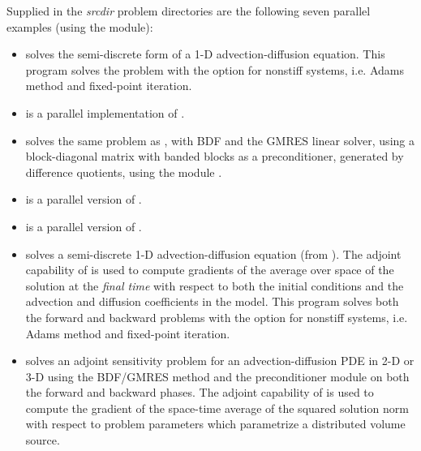 
\vspace{0.2in}\noindent 
Supplied in the {\em srcdir} problem directories are
the following seven parallel examples (using the {\nvecp} module):

\begin{itemize}


\item {}
  solves the semi-discrete form of a 1-D advection-diffusion equation.
  \newline
  This program solves the problem with the option for nonstiff systems,
  i.e. Adams method and fixed-point iteration.
\item {}
  is a parallel implementation of .
\item {}
  solves the same problem as , with BDF and the GMRES linear
  solver, using a block-diagonal matrix with banded blocks as a preconditioner, 
  generated by difference quotients, using the module {\cvbbdpre}.


\item {}
  is a parallel version of .
\item {}
  is a parallel version of .

\item {}
  solves a semi-discrete 1-D advection-diffusion equation (from ).
  \newline
  The adjoint capability of {\cvodes} is used to compute gradients
  of the average over space of the solution at the {\em final time} with
  respect to both the initial conditions and the advection and
  diffusion coefficients in the model.
  This program solves both the forward and backward problems with the option 
  for nonstiff systems, i.e. Adams method and fixed-point iteration.
\item {}
  solves an adjoint sensitivity problem for an advection-diffusion PDE in 2-D 
  or 3-D using the BDF/GMRES method and the {\cvbbdpre} preconditioner module
  on both the forward and backward phases.
  \newline
  The adjoint capability of {\cvodes} is used to compute the gradient of the
  space-time average of the squared solution norm with respect to problem 
  parameters which parametrize a distributed volume source.

\end{itemize}

